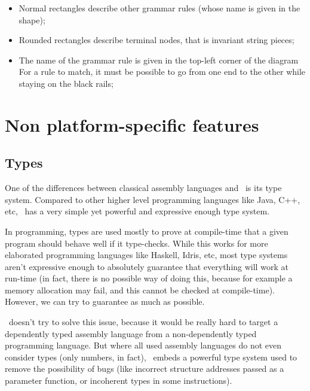 \begin{itemize}
\begin{figure}[H]
{          }
        \end{figure}
        \begin{itemize}
          \item Normal rectangles describe other grammar rules (whose name is given in the shape);
          \item Rounded rectangles describe terminal nodes, that is invariant string pieces;
          \item The name of the grammar rule is given in the top-left corner of the diagram
                For a rule to match, it must be possible to go from one end to the other while staying on the black rails;
        \end{itemize}
\end{itemize}

\chapter{Non platform-specific features}\label{chap:nstar-common}

\section{Types}\label{sec:nstar-common-ts}

One of the differences between classical assembly languages and \nstar\ is its type system.
Compared to other higher level programming languages like Java, C++, etc, \nstar\ has a very simple yet powerful and expressive enough type system.

In programming, types are used mostly to prove at compile-time that a given program should behave well if it type-checks. While this works for more elaborated programming languages like Haskell, Idris, etc, most type systems aren't expressive enough to absolutely guarantee that everything will work at run-time (in fact, there is no possible way of doing this, because for example a memory allocation may fail, and this cannot be checked at compile-time). However, we can try to guarantee as much as possible.

\nstar\ doesn't try to solve this issue, because it would be really hard to target a dependently typed assembly language from a non-dependently typed programming language. But where all used assembly languages do not even consider types (only numbers, in fact), \nstar\ embeds a powerful type system used to remove the possibility of bugs (like incorrect structure addresses passed as a parameter function, or incoherent types in some instructions).

